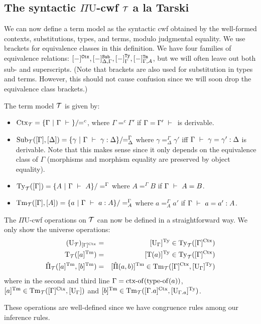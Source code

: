 \documentclass{lmcs}
\def\UU{\mathrm{U}}
\def\Ta{\mathrm{T}}
\def\Pihat{\hat{\Pi}}
\begin{document}
\subsection{The syntactic $\Pi\UU$-cwf ${\mathcal T}$ a la Tarski}
We can now define a term model as the syntactic cwf obtained by the well-formed contexts, substitutions, types, and terms, modulo judgmental equality. We use brackets for equivalence classes in this definition. We have four families of equivalence relations: 
$[-]^{\tt Ctx}, [-]^{\tt Sub}_{\Delta,\Gamma},[-]^{\tt Ty}_{\Gamma},[-]^{\tt Tm}_{\Gamma,A}$, but we will often leave out both sub- and superscripts. (Note that brackets are also used for substitution in types and terms. However, this should not cause confusion since we will soon drop the equivalence class brackets.)

\begin{defi}
The term model ${\mathcal T}$ is given by:
\begin{itemize}
\item $\mathrm{Ctx}_{\mathcal T} = \{ {\Gamma}\ |\ \Gamma \ \vdash\  \} /\!\! =^c$, where
  ${\Gamma} =^c {\Gamma}'$ if ${\Gamma} = {\Gamma}' \ \vdash\ $ is
  derivable.
\item
  $\mathrm{Sub}_{\mathcal T}([{\Gamma}],[{\Delta}]) = \{ \gamma\ |\ \Gamma \ \vdash\  \gamma
  : {\Delta} \} /\!\! =^{\Gamma}_{\Delta}$
  where $\gamma =^{\Gamma}_{\Delta} \gamma'$ iff
  ${\Gamma} \ \vdash\  \gamma = \gamma' : {\Delta}$ is derivable. Note that
  this makes sense since it only depends on the equivalence class of
  $\Gamma$ (morphisms and morphism equality are preserved by object
  equality).
\item $\mathrm{Ty}_{\mathcal T}([{\Gamma}]) = \{ A\ |\ \Gamma \ \vdash\  A
  \}/=^{\Gamma}$ where $A =^{\Gamma} B$ if $\Gamma \ \vdash\  A =
  B$.
\item $\Tm_\T([{\Gamma}],[A]) = \{ a\ |\ \Gamma \vdashS a: A\} / =^{\Gamma}_A$ where $a =^{\Gamma}_A
a'$ if $\Gamma \ \vdash\  a = a' : A$. 
\end{itemize}
The $\Pi\UU$-cwf operations on ${\mathcal T}$ can now be defined in a straightforward way. 
We only show the universe operations:
\begin{eqnarray*}
(\UU_\T)_{[\Gamma]^\Ctx} &= &[ \UU_\Gamma ]^\Ty \in \Ty_\T([\Gamma]^\Ctx)\\
\Ta_\T([a]^\Tm) &=& [\Ta(a)]^\Ty \in \Ty_\T([\Gamma]^\Ctx)\\
\Pihat_\T([a]^\Tm,[b]^\Tm) &=& [ \Pihat(a,b) ]^\Tm  \in \Tm_\T([\Gamma]^\Ctx,[\UU_\Gamma]^\Ty)
\end{eqnarray*}
where in the second and third line $\Gamma = \operatorname{ctx-of}(\operatorname{type-of}(a))$, $[a]^\Tm \in \Tm_\T([\Gamma]^\Ctx,[\UU_\Gamma])$ and $[b]^\Tm \in \Tm_\T([\Gamma.a]^\Ctx,[\UU_{\Gamma.a}]^\Ty)$.

These operations are well-defined since we have congruence rules among our inference rules.
\end{defi}
\end{document}

